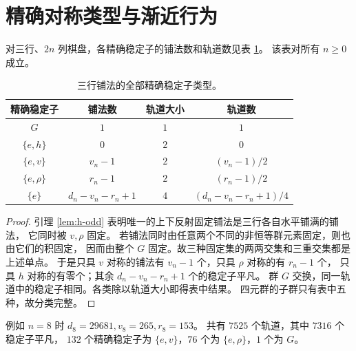 \section{精确对称类型与渐近行为}\label{sec:types}

\begin{theorem}[精确稳定子分类]\label{thm:stabilizers}
对三行、$2n$ 列棋盘，各精确稳定子的铺法数和轨道数见表 \ref{tab:stabilizers}。
该表对所有 $n\ge0$ 成立。
\end{theorem}
\begin{table}[htbp]
\centering
\caption{三行铺法的全部精确稳定子类型。}\label{tab:stabilizers}
\begin{tabular}{cccc}
\toprule
精确稳定子 & 铺法数 & 轨道大小 & 轨道数\\
\midrule
$G$ & $1$ & $1$ & $1$\\
$\{e,h\}$ & $0$ & $2$ & $0$\\
$\{e,v\}$ & $v_n-1$ & $2$ & $(v_n-1)/2$\\
$\{e,\rho\}$ & $r_n-1$ & $2$ & $(r_n-1)/2$\\
$\{e\}$ & $d_n-v_n-r_n+1$ & $4$ & $(d_n-v_n-r_n+1)/4$\\
\bottomrule
\end{tabular}
\end{table}
\begin{proof}
引理 \ref{lem:h-odd} 表明唯一的上下反射固定铺法是三行各自水平铺满的铺法，
它同时被 $v,\rho$ 固定。
若铺法同时由任意两个不同的非恒等群元素固定，则也由它们的积固定，
因而由整个 $G$ 固定。故三种固定集的两两交集和三重交集都是上述单点。
于是只具 $v$ 对称的铺法有 $v_n-1$ 个，只具 $\rho$ 对称的有 $r_n-1$ 个，
只具 $h$ 对称的有零个；其余 $d_n-v_n-r_n+1$ 个的稳定子平凡。
群 $G$ 交换，同一轨道中的稳定子相同。各类除以轨道大小即得表中结果。
四元群的子群只有表中五种，故分类完整。
\end{proof}

例如 $n=8$ 时 $d_8=29681,v_8=265,r_8=153$。
共有 $7525$ 个轨道，其中 $7316$ 个稳定子平凡，
$132$ 个精确稳定子为 $\{e,v\}$，$76$ 个为 $\{e,\rho\}$，$1$ 个为 $G$。

